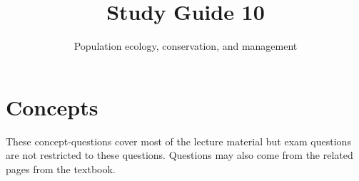 \documentclass[nofonts, letterpaper]{tufte-handout}
\title{Study Guide 10}
\author{Population ecology, conservation, and management}
\date{} %
\begin{document}
\maketitle	%


\section{Concepts}

These concept-questions cover most of the lecture material but exam questions are not restricted to these questions. Questions may also come from the related pages from the textbook.\vspace{\baselineskip}
\end{document}
